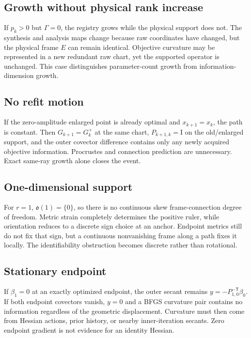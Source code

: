 \documentclass[10pt,twocolumn]{article}
\theoremstyle{definition}
\theoremstyle{remark}
\newcommand{\Id}{\mathrm I}
\begin{document}
\subsection{Growth without physical rank increase}

If $p_k>0$ but $\Gamma=0$, the registry grows while the physical support does
not.  The synthesis and analysis maps change because raw coordinates have
changed, but the physical frame $E$ can remain identical.  Objective
curvature may be represented in a new redundant raw chart, yet the supported
operator is unchanged.  This case distinguishes parameter-count growth from
information-dimension growth.

\subsection{No refit motion}

If the zero-amplitude enlarged point is already optimal and
$x_{k+1}=x_k$, the path is constant.  Then $G_{k+1}=G_k^+$ at the same chart,
$P_{k+1,k}=\Id$ on the old/enlarged support, and the outer covector difference
contains only any newly acquired objective information.  Procrustes and
connection prediction are unnecessary.  Exact same-ray growth alone closes
the event.

\subsection{One-dimensional support}

For $r=1$, $\mathfrak o(1)=\{0\}$, so there is no continuous skew
frame-connection degree of freedom.  Metric strain completely determines the
positive ruler, while orientation reduces to a discrete sign choice at an
anchor.  Endpoint metrics still do not fix that sign, but a continuous
nonvanishing frame along a path fixes it locally.  The identifiability
obstruction becomes discrete rather than rotational.

\subsection{Stationary endpoint}

If $\beta_1=0$ at an exactly optimized endpoint, the outer secant remains
$y=-P_{1,0}^{-\mathsf T}\beta_0$.  If both endpoint covectors vanish, $y=0$
and a BFGS curvature pair contains no information regardless of the geometric
displacement.  Curvature must then come from Hessian actions, prior history,
or nearby inner-iteration secants.  Zero endpoint gradient is not evidence
for an identity Hessian.
\end{document}
